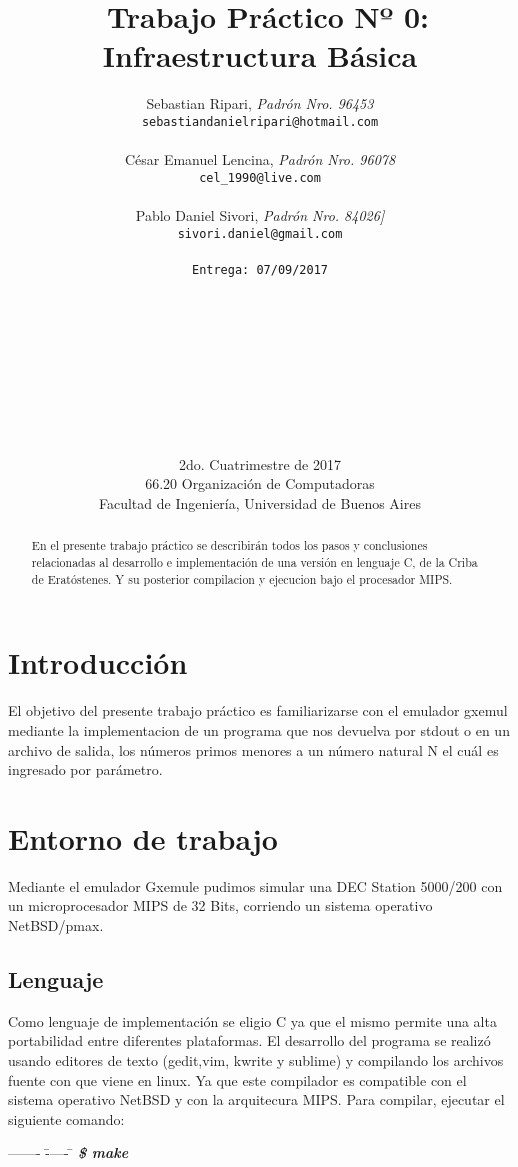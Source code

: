 \documentclass[a4paper,10pt]{article}
\title{	\ Trabajo Práctico Nº 0: Infraestructura Básica }
\author{	Sebastian Ripari, \textit{Padrón Nro. 96453}\\
            \texttt{ sebastiandanielripari@hotmail.com }\\\\
            César Emanuel Lencina, \textit{Padrón Nro. 96078}\\
            \texttt{ cel\_1990@live.com }\\\\
			Pablo Daniel Sivori, \textit{Padrón Nro. 84026] }\\
            \texttt{ sivori.daniel@gmail.com }\\\\               
            \texttt{\footnotesize Entrega: 07/09/2017}\\
            \\\\\\\\\\\\\\\\\\
            \normalsize{2do. Cuatrimestre de 2017}\\ 
            \normalsize{66.20 Organización de Computadoras} \\
            \normalsize{Facultad de Ingeniería, Universidad de Buenos Aires} \\}
\date{}
\begin{document}
\maketitle
\thispagestyle{empty}
\begin{abstract}
En el presente trabajo práctico se describirán todos los pasos y 
conclusiones relacionadas al desarrollo e implementación de una versión en lenguaje C,
de la Criba de Eratóstenes. Y su posterior compilacion y ejecucion bajo el procesador MIPS.
\end{abstract}
\newpage{}
\tableofcontents
\newpage{}

\begin{flushleft}

\par\end{flushleft}
\section{{\normalsize Introducción}}

El objetivo del presente trabajo práctico es familiarizarse con el emulador gxemul mediante la implementacion de un programa que nos devuelva por stdout o en un archivo de salida, los números primos menores a un número natural N el cuál es ingresado por parámetro.

\section{{\normalsize Entorno de trabajo}}
Mediante el emulador Gxemule pudimos simular una DEC Station 5000/200 con un microprocesador MIPS de 32 Bits, corriendo un sistema 
operativo NetBSD/pmax.

\subsection{{\normalsize Lenguaje}}

Como lenguaje de implementación se eligio C ya que el mismo permite una alta portabilidad entre 
diferentes plataformas. El desarrollo del programa se realizó usando editores de texto 
(gedit,vim, kwrite y sublime) y compilando los archivos fuente con 
 que viene en linux. Ya que este compilador es compatible
con el sistema operativo NetBSD y con la arquitecura MIPS.
Para compilar, ejecutar el siguiente comando:

\begin{tabbing}
------- \= ----- \= \kill
\> \textbf{\emph{\$ make}}\\ 
\end{tabbing}
\end{document}
